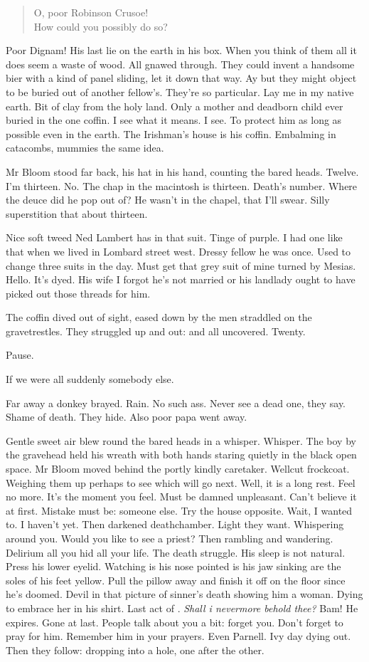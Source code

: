 \begin{verse}
    O, poor Robinson Crusoe! \\
    How could you possibly do so?
\end{verse}


Poor Dignam!
His last lie on the earth in his box.
When you think of them all
it does seem a waste of wood.
All gnawed through.
They could invent a handsome bier with a kind of panel sliding,
let it down that way.
Ay but they might object to be buried out of another fellow's.
They're so particular.
Lay me in my native earth.
Bit of clay from the holy land.
Only a mother and deadborn child ever buried in the one coffin.
I see what it means.
I see.
To protect him as long as possible even in the earth.
The Irishman's house is his coffin.
Embalming in catacombs, mummies the same idea.

Mr Bloom stood far back, his hat in his hand,
counting the bared heads.
Twelve.
I'm thirteen.
No.
The chap in the macintosh is thirteen.
Death's number.
Where the deuce did he pop out of?
He wasn't in the chapel, that I'll swear.
Silly superstition that about thirteen.

Nice soft tweed Ned Lambert has in that suit.
Tinge of purple.
I had one like that when we lived in Lombard street west.
Dressy fellow he was once.
Used to change three suits in the day.
Must get that grey suit of mine turned by Mesias.
Hello.
It's dyed.
His wife
I forgot he's not married
or his landlady ought to have picked out those threads for him.

The coffin dived out of sight,
eased down by the men straddled on the gravetrestles.
They struggled up and out:
and all uncovered.
Twenty.

Pause.

If we were all suddenly somebody else.

Far away a donkey brayed.
Rain.
No such ass.
Never see a dead one, they say.
Shame of death.
They hide.
Also poor papa went away.

Gentle sweet air blew round the bared heads in a whisper.
Whisper.
The boy by the gravehead held his wreath with both hands
staring quietly in the black open space.
Mr Bloom moved behind the portly kindly caretaker.
Wellcut frockcoat.
Weighing them up perhaps to see which will go next.
Well, it is a long rest.
Feel no more.
It's the moment you feel.
Must be damned unpleasant.
Can't believe it at first.
Mistake must be:
someone else.
Try the house opposite.
Wait, I wanted to.
I haven't yet.
Then darkened deathchamber.
Light they want.
Whispering around you.
Would you like to see a priest?
Then rambling and wandering.
Delirium all you hid all your life.
The death struggle.
His sleep is not natural.
Press his lower eyelid.
Watching
is his nose pointed
is his jaw sinking
are the soles of his feet yellow.
Pull the pillow away and finish it off on the floor
since he's doomed.
Devil in that picture of sinner's death
showing him a woman.
Dying to embrace her in his shirt.
Last act of .
\emph{Shall i nevermore behold thee?}
Bam!
He expires.
Gone at last.
People talk about you a bit:
forget you.
Don't forget to pray for him.
Remember him in your prayers.
Even Parnell.
Ivy day dying out.
Then they follow:
dropping into a hole, one after the other.

